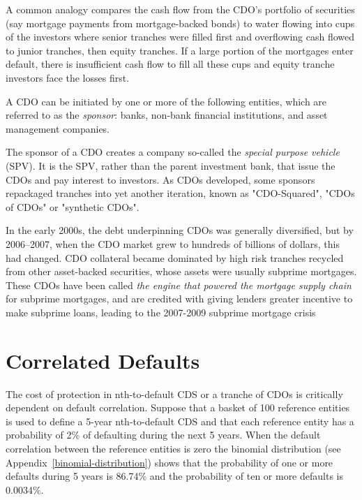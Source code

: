 A common analogy compares the cash flow from the CDO's portfolio of securities (say mortgage payments from mortgage-backed bonds) to water flowing into cups of the investors where senior tranches were filled first and overflowing cash flowed to junior tranches, then equity tranches. If a large portion of the mortgages enter default, there is insufficient cash flow to fill all these cups and equity tranche investors face the losses first.

A CDO can be initiated by one or more of the following entities, which are referred to as the
\emph{sponsor}: banks, non-bank financial institutions, and asset management companies. 

The sponsor of a CDO creates a company so-called the \emph{special purpose vehicle} (SPV).
It is the SPV, rather than the parent investment bank, that issue the CDOs and pay interest to investors. As CDOs developed, some sponsors repackaged tranches into yet another iteration, known as "CDO-Squared", "CDOs of CDOs" or "synthetic CDOs".

In the early 2000s, the debt underpinning CDOs was generally diversified, but by 2006–2007, when the CDO market grew to hundreds of billions of dollars, this had changed. CDO collateral became dominated by high risk tranches recycled from other asset-backed securities, whose assets were usually subprime mortgages. These CDOs have been called \emph{the engine that powered the mortgage supply chain} for subprime mortgages, and are credited with giving lenders greater incentive to make subprime loans, leading to the 2007-2009 subprime mortgage crisis

\section{Correlated Defaults}\label{correlated-defaults}
The cost of protection in nth-to-default CDS or a tranche of CDOs is critically dependent
on default correlation. 
Suppose that a basket of 100 reference entities is used to define a 5-year
nth-to-default CDS and that each reference entity has a probability of 2\% of defaulting during the next
5 years. When the default correlation between the reference entities is zero the binomial distribution (see Appendix~\ref{binomial-distribution}) 
shows that the probability of one or more defaults during 5 years is 86.74\% and the probability of ten or more defaults is 0.0034\%.

